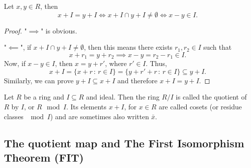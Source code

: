 \documentclass[10pt, a4paper]{article}
\begin{document}
\begin{lemma}
    Let $x, y \in R$,
    then
    \[
    x + I = y + I \iff x + I \cap y + I \neq \emptyset \iff x - y \in I.
    \]

    \begin{proof}
        "$\implies$"
        is obvious.

        "$\impliedby$",
        if $x + I \cap y + I \neq \emptyset$,
        then this means there exists $r_1, r_2 \in I$ such that
        \[
        x + r_1 = y + r_2 \implies x - y = r_2 - r_1 \in I.
        \]
        Now,
        if $x - y \in I$,
        then $x = y + r'$,
        where $r' \in I$.
        Thus,
        \[
        x + I = \{x + r\,:\, r \in I\} = \{y + r' + r\,:\, r \in I\} \subseteq y + I.
        \]
        Similarly,
        we can prove $y + I \subseteq x + I$ and therefore $x + I = y + I$.
    \end{proof}
\end{lemma}

\begin{definition}
    Let $R$ be a ring and $I \subseteq R$ and ideal.
    Then the ring $R / I$ is called the quotient of $R$ by $I$,
    or $R\mod{I}$.
    Its elements $x + I$,
    for $x \in R$ are called cosets
    (or residue classes $\mod{I}$)
    and are sometimes also written $\bar{x}$.
\end{definition}

\subsection{The quotient map and The First Isomorphism Theorem
    (FIT)}
\end{document}
